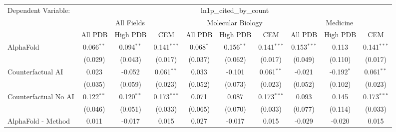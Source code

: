 \begingroup
\centering
\begin{tabular}{lccccccccc}
   \tabularnewline \midrule \midrule
   Dependent Variable: & \multicolumn{9}{c}{ln1p\_cited\_by\_count}\\
 & \multicolumn{3}{c}{All Fields} & \multicolumn{3}{c}{Molecular Biology} & \multicolumn{3}{c}{Medicine} \\
\cmidrule(lr){2-7} \cmidrule(lr){5-10} \cmidrule(lr){8-7}
 & \multicolumn{1}{c}{All PDB} & \multicolumn{1}{c}{High PDB} & \multicolumn{1}{c}{CEM} & \multicolumn{1}{c}{All PDB} & \multicolumn{1}{c}{High PDB} & \multicolumn{1}{c}{CEM} & \multicolumn{1}{c}{All PDB} & \multicolumn{1}{c}{High PDB} & \multicolumn{1}{c}{CEM} \\
\cmidrule(lr){2-3} \cmidrule(lr){3-4} \cmidrule(lr){4-5} \cmidrule(lr){5-6} \cmidrule(lr){6-7} \cmidrule(lr){7-8} \cmidrule(lr){8-9} \cmidrule(lr){9-10} \cmidrule(lr){10-3}
   AlphaFold                                                   & 0.066$^{**}$  & 0.094$^{**}$  & 0.141$^{***}$ & 0.068$^{*}$  & 0.156$^{**}$ & 0.141$^{***}$ & 0.153$^{***}$  & 0.113          & 0.141$^{***}$\\   
                                                               & (0.029)       & (0.043)       & (0.017)       & (0.037)      & (0.062)      & (0.017)       & (0.049)        & (0.110)        & (0.017)\\   
   Counterfactual AI                                           & 0.023         & -0.052        & 0.061$^{**}$  & 0.033        & -0.101       & 0.061$^{**}$  & -0.021         & -0.192$^{*}$   & 0.061$^{**}$\\   
                                                               & (0.035)       & (0.059)       & (0.023)       & (0.052)      & (0.073)      & (0.023)       & (0.052)        & (0.102)        & (0.023)\\   
   Counterfactual No AI                                        & 0.122$^{**}$  & 0.120$^{**}$  & 0.173$^{***}$ & 0.071        & 0.087        & 0.173$^{***}$ & 0.093          & 0.145          & 0.173$^{***}$\\   
                                                               & (0.046)       & (0.051)       & (0.033)       & (0.065)      & (0.070)      & (0.033)       & (0.077)        & (0.114)        & (0.033)\\   
   AlphaFold - Method                                          & 0.011         & -0.017        & 0.015         & 0.027        & -0.017       & 0.015         & -0.029         & -0.020         & 0.015\\   

\end{tabular}
